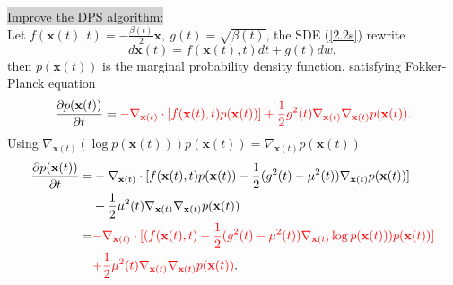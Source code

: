 \documentclass[mathserif,envcountsect,compress,8pt]{beamer}
\begin{document}
\begin{frame}


	\begin{figure}[H]
		\centering
		\centering
		\label{fig_1}
	\end{figure}
	
\end{frame}


\begin{frame}
	\setlength{\parskip}{0.6\baselineskip}
	\colorbox {lightgray}{{\color{blue}Improve the DPS algorithm:}}\\
	\vspace{20pt}
	Let $f(\mathbf{x}(t),t)=-\frac{\beta(t)}{2}\mathbf{x}, ~g(t)=\sqrt{\beta(t)}$, the SDE (\ref{2.2s}) rewrite
	\begin{equation*}
		d\mathbf{x}(t)=f(\mathbf{x}(t),t)dt+g(t)dw,
	\end{equation*}
	then $p(\mathbf{x}(t))$ is the marginal probability density function, satisfying Fokker-Planck equation
	\begin{equation}    \label{FP1}
		\frac{\partial p(\mathbf{x}(t))}{\partial t}={\color{red}-\nabla_{\mathbf{x}(t)}\cdot[f(\mathbf{x}(t),t)p(\mathbf{x}(t))]+\frac{1}{2}g^2(t)\nabla_{\mathbf{x}(t)}\nabla_{\mathbf{x}(t)}p(\mathbf{x}(t))}.
	\end{equation}
	Using $\nabla_{\mathbf{x}(t)}(\log p(\mathbf{x}(t)))p(\mathbf{x}(t))=\nabla_{\mathbf{x}(t)}p(\mathbf{x}(t))$
	\begin{equation}
		\begin{aligned}
			\frac{\partial p(\mathbf{x}(t))}{\partial t}= & -\nabla_{\mathbf{x}(t)}\cdot[f(\mathbf{x}(t),t)p(\mathbf{x}(t))-\frac{1}{2}(g^2(t)-\mu^2(t))\nabla_{\mathbf{x}(t)}p(\mathbf{x}(t))]                     \\
			                                              & +\frac{1}{2}\mu^2(t)\nabla_{\mathbf{x}(t)}\nabla_{\mathbf{x}(t)}p(\mathbf{x}(t))                                                                        \\
			=                                             & {\color{red}-\nabla_{\mathbf{x}(t)}\cdot[(f(\mathbf{x}(t),t)-\frac{1}{2}(g^2(t)-\mu^2(t))\nabla_{\mathbf{x}(t)}\log p(\mathbf{x}(t)))p(\mathbf{x}(t))]} \\
			                                              & {\color{red}+\frac{1}{2}\mu^2(t)\nabla_{\mathbf{x}(t)}\nabla_{\mathbf{x}(t)}p(\mathbf{x}(t))}.
			\label{FP2}
		\end{aligned}
	\end{equation}
\end{frame}
\end{document}
